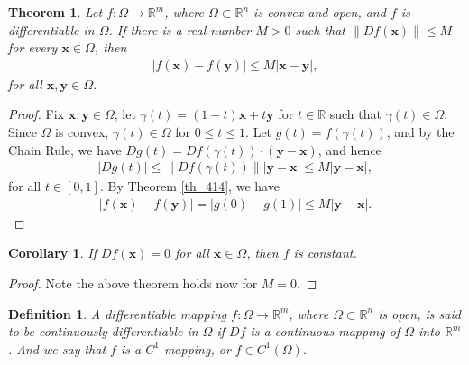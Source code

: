 \documentclass[11pt]{book}
\newtheorem{definition}{Definition}[chapter]
\newtheorem{theorem}{Theorem}[chapter]
\newtheorem{corollary}{Corollary}[theorem]
\theoremstyle{definition}
\numberwithin{equation}{chapter}
\begin{document}
\begin{theorem}\label{th_77}
Let $f: \Omega \to \mathbb{R}^m$, where $\Omega \subset \mathbb{R}^n$ is convex and open, and $f$ is differentiable in $\Omega$. If there is a real number $M > 0$ such that $\left\|Df(\mathbf{x})\right\| \leq M$ for every $\mathbf{x} \in \Omega$, then 
\begin{align*}
    \left|f(\mathbf{x}) - f(\mathbf{y})\right| \leq M \left|\mathbf{x} - \mathbf{y}\right|,
\end{align*}
for all $\mathbf{x}, \mathbf{y} \in \Omega$.
\end{theorem}
\begin{proof}
Fix $\mathbf{x}, \mathbf{y} \in \Omega$, let $\gamma(t) = (1 - t)\mathbf{x} + t\mathbf{y}$ for $t \in \mathbb{R}$ such that $\gamma(t) \in \Omega$. Since $\Omega$ is convex, $\gamma(t) \in \Omega$ for $0 \leq t \leq 1$. Let $g(t) = f(\gamma(t))$, and by the Chain Rule, we have $Dg(t) = Df(\gamma(t)) \cdot (\mathbf{y} - \mathbf{x})$, and hence
\begin{align*}
    \left|Dg(t)\right| \leq \left\|Df(\gamma(t))\right\| \left|\mathbf{y} - \mathbf{x}\right| \leq M \left|\mathbf{y} - \mathbf{x}\right|,
\end{align*}
for all $t \in [0,1]$. By Theorem \ref{th_414}, we have
\begin{align*}
    \left|f(\mathbf{x}) - f(\mathbf{y})\right| = \left|g(0) - g(1)\right| \leq M \left|\mathbf{y} - \mathbf{x}\right|.
\end{align*}
\end{proof}

\medskip

\begin{corollary}
If $Df(\mathbf{x}) = 0$ for all $\mathbf{x} \in \Omega$, then $f$ is constant.
\end{corollary}
\begin{proof}
Note the above theorem holds now for $M = 0$.
\end{proof}

\medskip

\begin{definition}
A differentiable mapping $f: \Omega \to \mathbb{R}^m$, where $\Omega \subset \mathbb{R}^n$ is open, is said to be continuously differentiable in $\Omega$ if $Df$ is a continuous mapping of $\Omega$ into $\mathbb{R}^m$. And we say that $f$ is a $C^1$-mapping, or $f \in C^1(\Omega)$.
\end{definition}

\medskip
\end{document}
